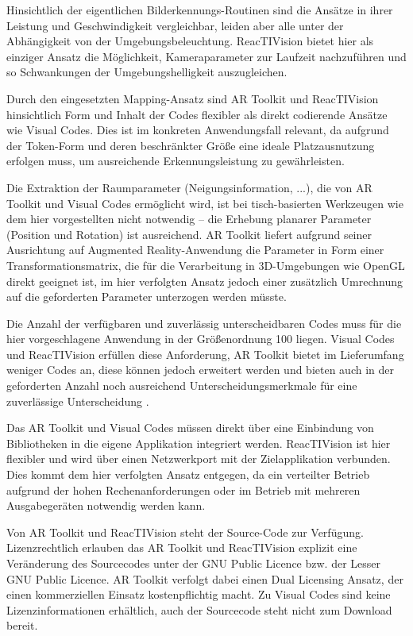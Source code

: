 Hinsichtlich der eigentlichen Bilderkennungs-Routinen sind die Ansätze in ihrer Leistung und Geschwindigkeit vergleichbar, leiden aber alle unter der Abhängigkeit von der Umgebungsbeleuchtung. ReacTIVision bietet hier als einziger Ansatz die Möglichkeit, Kameraparameter zur Laufzeit nachzuführen und so Schwankungen der Umgebungshelligkeit auszugleichen.

Durch den eingesetzten Mapping-Ansatz sind AR Toolkit und ReacTIVision hinsichtlich Form und Inhalt der Codes flexibler als direkt codierende Ansätze wie Visual Codes. Dies ist im konkreten Anwendungsfall relevant, da aufgrund der Token-Form und deren beschränkter Größe eine ideale Platzausnutzung erfolgen muss, um ausreichende Erkennungsleistung zu gewährleisten.

Die Extraktion der Raumparameter (Neigungsinformation, ...), die von AR Toolkit und Visual Codes ermöglicht wird, ist bei tisch-basierten Werkzeugen wie dem hier vorgestellten nicht notwendig -- die Erhebung planarer Parameter (Position und Rotation) ist ausreichend. AR Toolkit liefert aufgrund seiner Ausrichtung auf Augmented Reality-Anwendung die Parameter in Form einer Transformationsmatrix, die für die Verarbeitung in 3D-Umgebungen wie OpenGL direkt geeignet ist, im hier verfolgten Ansatz jedoch einer zusätzlich Umrechnung auf die geforderten Parameter unterzogen werden müsste.

Die Anzahl der verfügbaren und zuverlässig unterscheidbaren Codes muss für die hier vorgeschlagene Anwendung in der Größenordnung 100 liegen. Visual Codes und ReacTIVision erfüllen diese Anforderung, AR Toolkit bietet im Lieferumfang weniger Codes an, diese können jedoch erweitert werden und bieten auch in der geforderten Anzahl noch ausreichend Unterscheidungsmerkmale für eine zuverlässige Unterscheidung \citep{Wagner03}.

Das AR Toolkit und Visual Codes müssen direkt über eine Einbindung von Bibliotheken in die eigene Applikation integriert werden. ReacTIVision ist hier flexibler und wird über einen Netzwerkport mit der Zielapplikation verbunden. Dies kommt dem hier verfolgten Ansatz entgegen, da ein verteilter Betrieb aufgrund der hohen Rechenanforderungen oder im Betrieb mit mehreren Ausgabegeräten notwendig werden kann.

Von AR Toolkit und ReacTIVision steht der Source-Code zur Verfügung. Lizenzrechtlich erlauben das AR Toolkit und ReacTIVision explizit eine Veränderung des Sourcecodes unter der GNU Public Licence bzw. der Lesser GNU Public Licence. AR Toolkit verfolgt dabei einen Dual Licensing Ansatz, der einen kommerziellen Einsatz kostenpflichtig macht. Zu Visual Codes sind keine Lizenzinformationen erhältlich, auch der Sourcecode steht nicht zum Download bereit.

